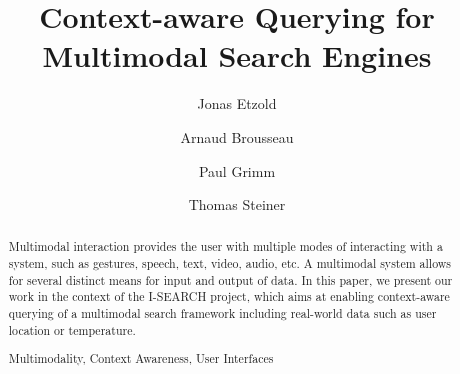 \documentclass[runningheads,a4paper]{llncs} \usepackage[utf8]{inputenc}
\newcommand{\keywords}[1]{\par\addvspace\baselineskip
\noindent\keywordname\enspace\ignorespaces#1}
\begin{document}
\mainmatter  %

\title{Context-aware Querying for\\ Multimodal Search Engines}


\author{Jonas Etzold \and Arnaud Brousseau \and Paul Grimm \and Thomas Steiner}



\maketitle

\begin{abstract}
Multimodal interaction provides the user with multiple modes of interacting with
a system, such as gestures, speech, text, video, audio, etc. A multimodal system allows for several distinct means for input and output of data. In this paper, we present our work in the context of the \mbox{I-SEARCH} project, which aims at enabling context-aware querying of a multimodal search framework including real-world data such as user location or temperature.

\keywords{Multimodality, Context Awareness, User Interfaces}
\end{abstract}
\end{document}

